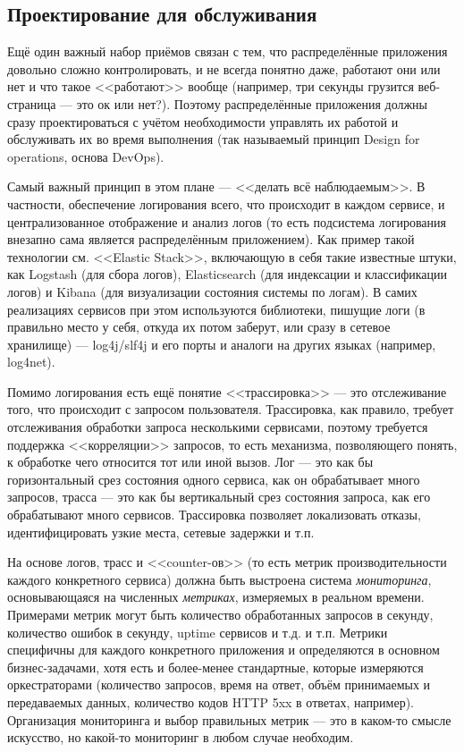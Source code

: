 \documentclass{../../text-style}
\begin{document}
\subsection{Проектирование для обслуживания}

Ещё один важный набор приёмов связан с тем, что распределённые приложения довольно сложно контролировать, и не всегда понятно даже, работают они или нет и что такое <<работают>> вообще (например, три секунды грузится веб-страница --- это ок или нет?). Поэтому распределённые приложения должны сразу проектироваться с учётом необходимости управлять их работой и обслуживать их во время выполнения (так называемый принцип Design for operations, основа DevOps).

Самый важный принцип в этом плане --- <<делать всё наблюдаемым>>. В частности, обеспечение логирования всего, что происходит в каждом сервисе, и централизованное отображение и анализ логов (то есть подсистема логирования внезапно сама является распределённым приложением). Как пример такой технологии см. <<Elastic Stack>>, включающую в себя такие известные штуки, как Logstash (для сбора логов), Elasticsearch (для индексации и классификации логов) и Kibana (для визуализации состояния системы по логам). В самих реализациях сервисов при этом используются библиотеки, пишущие логи (в правильно место у себя, откуда их потом заберут, или сразу в сетевое хранилище) --- log4j/slf4j и его порты и аналоги на других языках (например, log4net).

Помимо логирования есть ещё понятие <<трассировка>> --- это отслеживание того, что происходит с запросом пользователя. Трассировка, как правило, требует отслеживания обработки запроса несколькими сервисами, поэтому требуется поддержка <<корреляции>> запросов, то есть механизма, позволяющего понять, к обработке чего относится тот или иной вызов. Лог --- это как бы горизонтальный срез состояния одного сервиса, как он обрабатывает много запросов, трасса --- это как бы вертикальный срез состояния запроса, как его обрабатывают много сервисов. Трассировка позволяет локализовать отказы, идентифицировать узкие места, сетевые задержки и т.п.

На основе логов, трасс и <<counter-ов>> (то есть метрик производительности каждого конкретного сервиса) должна быть выстроена система \emph{мониторинга}, основывающаяся на численных \emph{метриках}, измеряемых в реальном времени. Примерами метрик могут быть количество обработанных запросов в секунду, количество ошибок в секунду, uptime сервисов и т.д. и т.п. Метрики специфичны для каждого конкретного приложения и определяются в основном бизнес-задачами, хотя есть и более-менее стандартные, которые измеряются оркестраторами (количество запросов, время на ответ, объём принимаемых и передаваемых данных, количество кодов HTTP 5xx в ответах, например). Организация мониторинга и выбор правильных метрик --- это в каком-то смысле искусство, но какой-то мониторинг в любом случае необходим.
\end{document}
